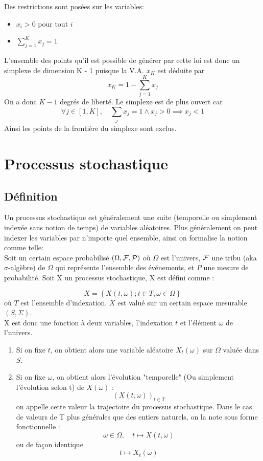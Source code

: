 \documentclass[french]{article}
\numberwithin{equation}{section}
\begin{document}
Des restrictions sont posées sur les variables:

\begin{itemize}
	\item $x_i > 0$ pour tout $i$
	\item $\sum_{j=1}^{K} x_j = 1$
\end{itemize}

\bigskip

L'ensemble des points qu'il est possible de générer par cette loi est donc un simplexe de dimension K - 1 puisque la V.A. $x_K$ est déduite par 
\[ x_K = 1 - \sum_{j=1}^{K} x_j\]
On a donc $K - 1$ degrés de liberté. Le simplexe est de plus ouvert car 
\[ \forall j \in [1, K], \quad \sum_j x_j = 1 \land x_j > 0 \implies x_j < 1 \]
Ainsi les points de la frontière du simplexe sont exclus.

\section{Processus stochastique}

\subsection{Définition}

Un processus stochastique est généralement une suite (temporelle ou simplement indexée sans notion de temps) de variables aléatoires. Plus généralement on peut indexer les variables par n'importe quel ensemble, ainsi on formalise la notion comme telle:\\

Soit un certain espace probabilisé $(\Omega, \cal{F}, P)$ où $\Omega$ est l'univers, $\cal{F}$ une tribu (aka $\sigma$-algèbre) de $\Omega$ qui représente l'ensemble des événements, et $P$ une mesure de probabilité. Soit X un processus stochastique, X est défini comme :

\[ 
X = \left\{ X(t, \omega); t \in T, \omega \in \Omega \right\}
\]
où $T$ est l'ensemble d'indexation. $X$ est valué sur un certain espace mesurable $(S, \Sigma)$.\\

X est donc une fonction à deux variables, l'indexation $t$ et l'élément $\omega$ de l'univers.

\begin{enumerate}
	\item Si on fixe $t$, on obtient alors une variable aléatoire $X_t(\omega)$ sur $\Omega$ valuée dans $S$.
	\item Si on fixe $\omega$, on obtient alors l'évolution "temporelle" (Ou simplement l'évolution selon t) de $X(\omega)$ : 
	\[ (X(t, \omega))_{t \in T} \]
	on appelle cette valeur la trajectoire du processus stochastique. Dans le cas de valeurs de T plus générales que des entiers naturels, on la note sous forme fonctionnelle :
	\[ \omega \in \Omega, \quad t \mapsto X(t, \omega) \]
	ou de façon identique
	\[ t \mapsto X_t(\omega) \]
\end{enumerate}
\bigskip
\end{document}
